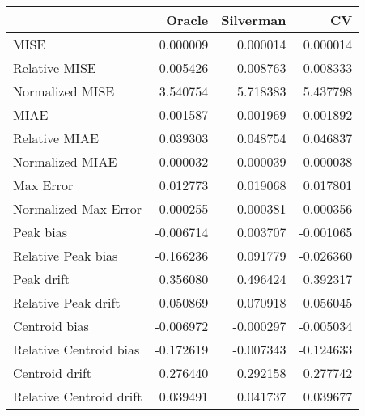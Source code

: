 \begin{tabular}{lrrr}
  \hline
 & Oracle & Silverman & CV \\ 
  \hline
MISE & 0.000009 & 0.000014 & 0.000014 \\ 
  Relative MISE & 0.005426 & 0.008763 & 0.008333 \\ 
  Normalized MISE & 3.540754 & 5.718383 & 5.437798 \\ 
  MIAE & 0.001587 & 0.001969 & 0.001892 \\ 
  Relative MIAE & 0.039303 & 0.048754 & 0.046837 \\ 
  Normalized MIAE & 0.000032 & 0.000039 & 0.000038 \\ 
  Max Error & 0.012773 & 0.019068 & 0.017801 \\ 
  Normalized Max Error & 0.000255 & 0.000381 & 0.000356 \\ 
  Peak bias & -0.006714 & 0.003707 & -0.001065 \\ 
  Relative Peak bias & -0.166236 & 0.091779 & -0.026360 \\ 
  Peak drift & 0.356080 & 0.496424 & 0.392317 \\ 
  Relative Peak drift & 0.050869 & 0.070918 & 0.056045 \\ 
  Centroid bias & -0.006972 & -0.000297 & -0.005034 \\ 
  Relative Centroid bias & -0.172619 & -0.007343 & -0.124633 \\ 
  Centroid drift & 0.276440 & 0.292158 & 0.277742 \\ 
  Relative Centroid drift & 0.039491 & 0.041737 & 0.039677 \\ 
   \hline
\end{tabular}
